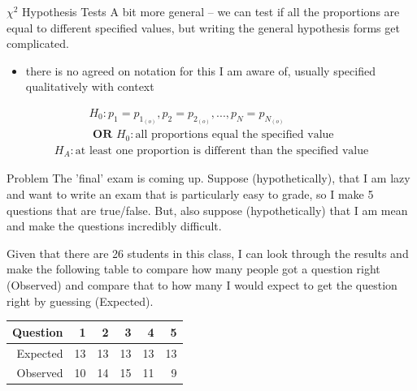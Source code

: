 \documentclass{beamer}
\begin{document}
\begin{frame}{$\chi^2$ Hypothesis Tests}
A bit more general -- we can test if all the proportions are equal to different specified values, but writing the general hypothesis forms get complicated.
\begin{itemize}
    \item there is no agreed on notation for this I am aware of, usually specified qualitatively with context
\end{itemize}
\begin{align*}
    H_0: p_1 = p_{1_{(o)}}, p_2 = p_{2_{(o)}}, ..., p_N = p_{N_{(o)}}\\
    \textbf{ OR } H_0: \text{all proportions equal the specified value}
\end{align*}
\begin{align*}
    H_A: \text{at least one proportion is different than the specified value}
\end{align*}
\end{frame}


\begin{frame}{Problem}
The 'final' exam is coming up. Suppose (hypothetically), that I am lazy and want to write an exam that is particularly easy to grade, so I make 5 questions that are true/false. But, also suppose (hypothetically) that I am mean and make the questions incredibly difficult. \vspace{6mm}

Given that there are 26 students in this class, I can look through the results and make the following table to compare how many people got a question right (Observed) and compare that to how many I would expect to get the question right by guessing (Expected).
\vspace{6mm}

\begin{table}[ht]
\centering
\begin{tabular}{rrrrrr}
  \hline
Question & 1 & 2 & 3 & 4 & 5 \\ 
  \hline
Expected & 13 & 13 & 13 & 13 & 13 \\ 
  Observed & 10 & 14 & 15 & 11 & 9 \\ 
   \hline
\end{tabular}
\end{table}
\end{frame}
\end{document}
